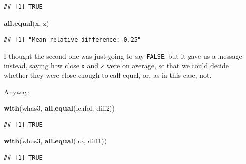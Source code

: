 \documentclass[]{tufte-book}
\newenvironment{Shaded}{}{}
\newcommand{\KeywordTok}[1]{\textcolor[rgb]{0.00,0.44,0.13}{\textbf{#1}}}
\newcommand{\NormalTok}[1]{#1}
\theoremstyle{definition}
\theoremstyle{definition}
\theoremstyle{definition}
\theoremstyle{remark}
\begin{document}
\begin{verbatim}
## [1] TRUE
\end{verbatim}

\begin{Shaded}
\begin{Highlighting}[]
\KeywordTok{all.equal}\NormalTok{(x, z)}
\end{Highlighting}
\end{Shaded}

\begin{verbatim}
## [1] "Mean relative difference: 0.25"
\end{verbatim}

I thought the second one was just going to say \texttt{FALSE}, but it
gave us a message instead, saying how close \texttt{x} and \texttt{z}
were on average, so that we could decide whether they were close enough
to call equal, or, as in this case, not.

Anyway:

\begin{Shaded}
\begin{Highlighting}[]
\KeywordTok{with}\NormalTok{(whas3, }\KeywordTok{all.equal}\NormalTok{(lenfol, diff2))}
\end{Highlighting}
\end{Shaded}

\begin{verbatim}
## [1] TRUE
\end{verbatim}

\begin{Shaded}
\begin{Highlighting}[]
\KeywordTok{with}\NormalTok{(whas3, }\KeywordTok{all.equal}\NormalTok{(los, diff1))}
\end{Highlighting}
\end{Shaded}

\begin{verbatim}
## [1] TRUE
\end{verbatim}
\end{document}
